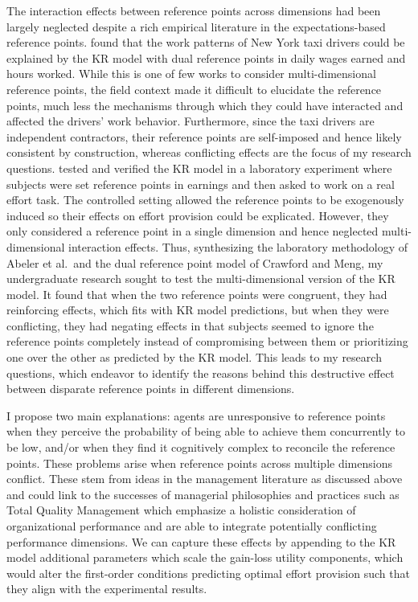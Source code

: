 \documentclass[12pt, letterpaper, DIV=11, numbers=noendperiod]{article}
\begin{document}
The interaction effects between reference points across dimensions had been largely neglected despite a rich empirical literature in the expectations-based reference points. \textcite{crawford.2011.newyork} found that the work patterns of New York taxi drivers could be explained by the KR model with dual reference points in daily wages earned and hours worked. While this is one of few works to consider multi-dimensional reference points, the field context made it difficult to elucidate the reference points, much less the mechanisms through which they could have interacted and affected the drivers' work behavior. Furthermore, since the taxi drivers are independent contractors, their reference points are self-imposed and hence likely consistent by construction, whereas conflicting effects are the focus of my research questions. \textcite{abeler.2011.referencepoints} tested and verified the KR model in a laboratory experiment where subjects were set reference points in earnings and then asked to work on a real effort task. The controlled setting allowed the reference points to be exogenously induced so their effects on effort provision could be explicated. However, they only considered a reference point in a single dimension and hence neglected multi-dimensional interaction effects. Thus, synthesizing the laboratory methodology of Abeler et al.~and the dual reference point model of Crawford and Meng, my undergraduate research sought to test the multi-dimensional version of the KR model. It found that when the two reference points were congruent, they had reinforcing effects, which fits with KR model predictions, but when they were conflicting, they had negating effects in that subjects seemed to ignore the reference points completely instead of compromising between them or prioritizing one over the other as predicted by the KR model. This leads to my research questions, which endeavor to identify the reasons behind this destructive effect between disparate reference points in different dimensions.

I propose two main explanations: agents are unresponsive to reference points when they perceive the probability of being able to achieve them concurrently to be low, and/or when they find it cognitively complex to reconcile the reference points. These problems arise when reference points across multiple dimensions conflict. These stem from ideas in the management literature as discussed above and could link to the successes of managerial philosophies and practices such as Total Quality Management which emphasize a holistic consideration of organizational performance and are able to integrate potentially conflicting performance dimensions. We can capture these effects by appending to the KR model additional parameters which scale the gain-loss utility components, which would alter the first-order conditions predicting optimal effort provision such that they align with the experimental results.
\end{document}

